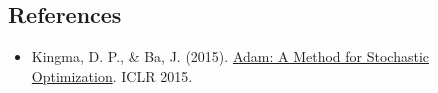 \FloatBarrier
{}
\hypertarget{references-28}{%
\subsection{References}\label{references-28}}

\vspace{0.25em}
\begin{itemize}
\tightlist
\item
  Kingma, D. P., \& Ba, J. (2015). \href{https://arxiv.org/abs/1412.6980}{Adam: A Method for Stochastic Optimization}. ICLR 2015.
\end{itemize}

\clearpage
